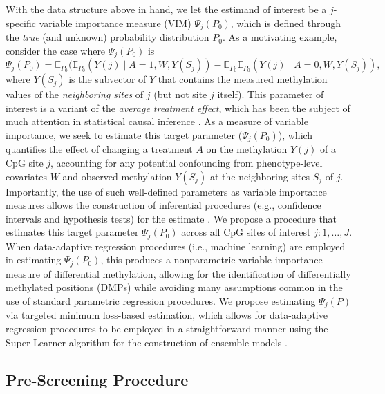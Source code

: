 \documentclass[9pt,a4paper,]{extarticle}
\theoremstyle{definition}
\theoremstyle{definition}
\theoremstyle{definition}
\theoremstyle{remark}
\begin{document}
With the data structure above in hand, we let the estimand of interest be a
\(j\)-specific variable importance measure (VIM) \(\Psi_j(P_0)\), which is defined
through the \emph{true} (and unknown) probability distribution \(P_0\). As a motivating
example, consider the case where \(\Psi_j(P_0)\) is
\begin{equation}\label{vim_param}
  \Psi_j(P_0) = \mathbb{E}_{P_0}(\mathbb{E}_{P_0}(Y(j) \mid A = 1, W, Y(S_j)) -
    \mathbb{E}_{P_0} \mathbb{E}_{P_0}(Y(j) \mid A = 0, W, Y(S_j)),
\end{equation}
where \(Y(S_j)\) is the subvector of \(Y\) that contains the measured methylation
values of the \emph{neighboring sites} of \(j\) (but not site \(j\) itself). This
parameter of interest is a variant of the \emph{average treatment effect}, which has
been the subject of much attention in statistical causal inference
\citep[\citet{hahn1998role}, \citet{hirano2003efficient}]{holland1986statistics}. As a measure of
variable importance, we seek to estimate this target parameter (\(\Psi_j(P_0)\)),
which quantifies the effect of changing a treatment \(A\) on the methylation
\(Y(j)\) of a CpG site \(j\), accounting for any potential confounding from
phenotype-level covariates \(W\) and observed methylation \(Y(S_j)\) at the
neighboring sites \(S_j\) of \(j\). Importantly, the use of such well-defined
parameters as variable importance measures allows the construction of
inferential procedures (e.g., confidence intervals and hypothesis tests) for the
estimate \citep{vdl2006statistical}. We propose a procedure that estimates this
target parameter \(\Psi_j(P_0)\) across all CpG sites of interest \(j: 1, \ldots, J\). When data-adaptive regression procedures (i.e., machine learning) are
employed in estimating \(\Psi_j(P_0)\), this produces a nonparametric variable
importance measure of differential methylation, allowing for the identification
of differentially methylated positions (DMPs) while avoiding many assumptions
common in the use of standard parametric regression procedures. We propose
estimating \(\Psi_j(P)\) via targeted minimum loss-based estimation, which allows
for data-adaptive regression procedures to be employed in a straightforward
manner using the Super Learner algorithm for the construction of ensemble models
\citep[\citet{wolpert1992stacked}, \citet{breiman1996stacked}, \citet{gruber2009targeted},
\citet{vdl2011targeted}]{vdl2007super}.

\hypertarget{pre-screening-procedure}{%
\subsection{Pre-Screening Procedure}\label{pre-screening-procedure}}
\end{document}
